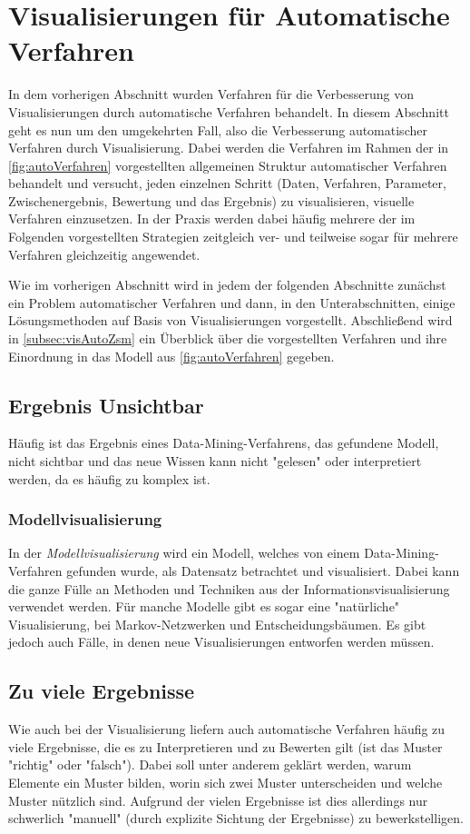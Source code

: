 	\section{Visualisierungen für Automatische Verfahren}
		In dem vorherigen Abschnitt wurden Verfahren für die Verbesserung von Visualisierungen durch automatische Verfahren behandelt. In diesem Abschnitt geht es nun um den umgekehrten Fall, also die Verbesserung automatischer Verfahren durch Visualisierung. Dabei werden die Verfahren im Rahmen der in \autoref{fig:autoVerfahren} vorgestellten allgemeinen Struktur automatischer Verfahren behandelt und versucht, jeden einzelnen Schritt (Daten, Verfahren, Parameter, Zwischenergebnis, Bewertung und das Ergebnis) zu visualisieren, \bzw visuelle Verfahren einzusetzen. In der Praxis werden dabei häufig mehrere der im Folgenden vorgestellten Strategien zeitgleich ver- und teilweise sogar für mehrere Verfahren gleichzeitig angewendet.

		Wie im vorherigen Abschnitt wird in jedem der folgenden Abschnitte zunächst ein Problem automatischer Verfahren und dann, in den Unterabschnitten, einige Lösungsmethoden auf Basis von Visualisierungen vorgestellt. Abschließend wird in \autoref{subsec:visAutoZsm} ein Überblick über die vorgestellten Verfahren und ihre Einordnung in das Modell aus \autoref{fig:autoVerfahren} gegeben.

		\subsection{Ergebnis Unsichtbar}
			Häufig ist das Ergebnis eines Data-Mining-Verfahrens, das gefundene Modell, nicht sichtbar und das neue Wissen kann nicht "gelesen" oder interpretiert werden, da es häufig zu komplex ist.

			\subsubsection{Modellvisualisierung}
				In der \emph{Modellvisualisierung} wird ein Modell, welches von einem Data-Mining-Verfahren gefunden wurde, als Datensatz betrachtet und visualisiert. Dabei kann die ganze Fülle an Methoden und Techniken aus der Informationsvisualisierung verwendet werden. Für manche Modelle gibt es sogar eine "natürliche" Visualisierung, \zB bei Markov-Netzwerken und Entscheidungsbäumen. Es gibt jedoch auch Fälle, in denen neue Visualisierungen entworfen werden müssen.

		\subsection{Zu viele Ergebnisse}
			Wie auch bei der Visualisierung liefern auch automatische Verfahren häufig zu viele Ergebnisse, die es zu Interpretieren und zu Bewerten gilt (ist das Muster "richtig" oder "falsch"). Dabei soll unter anderem geklärt werden, warum Elemente ein Muster bilden, worin sich zwei Muster unterscheiden und welche Muster nützlich sind. Aufgrund der vielen Ergebnisse ist dies allerdings nur schwerlich "manuell" (durch explizite Sichtung der Ergebnisse) zu bewerkstelligen.

